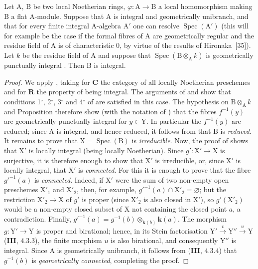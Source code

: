 \begin{corollary}[7.9.9]
\label{IV.7.9.9}
Let $\mathrm{A}$, $\mathrm{B}$ be two local Noetherian rings, $\varphi:\mathrm{A}\to\mathrm{B}$ a local homomorphism making $\mathrm{B}$ a flat $\mathrm{A}$-module. Suppose that $\mathrm{A}$ is integral and geometrically unibranch, and that for every finite integral $\mathrm{A}$-algebra $\mathrm{A}'$ one can resolve $\operatorname{Spec}(\mathrm{A}')$ \textup{(this will for example be the case if the formal fibres of $\mathrm{A}$ are geometrically regular and the residue field of $\mathrm{A}$ is of characteristic $0$, by virtue of the results of Hironaka~[35])}. Let $k$ be the residue field of $\mathrm{A}$ and suppose that $\operatorname{Spec}(\mathrm{B}\otimes_\mathrm{A} k)$ is geometrically punctually integral . Then $\mathrm{B}$ is integral.
\end{corollary}

\begin{proof}
We apply , taking for $\boldsymbol{C}$ the category of all locally Noetherian preschemes and for $\boldsymbol{R}$ the property of being integral. The arguments of  and  show that conditions 1${}^\circ$, 2${}^\circ$, 3${}^\circ$ and 4${}^\circ$ of  are satisfied in this case. The hypothesis on $\mathrm{B}\otimes_\mathrm{A}k$ and Proposition  therefore show (with the notation of ) that the fibres $f^{-1}(y)$ are geometrically punctually integral for $y\in\mathrm{Y}$. In particular the $f^{-1}(y)$ are reduced; since $\mathrm{A}$ is integral, and hence reduced, it follows from  that $\mathrm{B}$ is \emph{reduced}. It remains to prove that $\mathrm{X}=\operatorname{Spec}(\mathrm{B})$ is \emph{irreducible}. Now, the proof of  shows that $\mathrm{X}'$ is locally integral (being locally Noetherian). Since $g':\mathrm{X}'\to\mathrm{X}$ is surjective, it is therefore enough to show that $\mathrm{X}'$ is irreducible, or, since $\mathrm{X}'$ is locally integral, that $\mathrm{X}'$ is \emph{connected}. For this it is enough to prove that the fibre $g'^{-1}(a)$ is \emph{connected}. Indeed, if $\mathrm{X}'$ were the sum of two non-empty open preschemes $\mathrm{X}'_1$ and $\mathrm{X}'_2$, then, for example, $g'^{-1}(a)\cap\mathrm{X}'_2=\varnothing$; but the restriction $\mathrm{X}'_2\to\mathrm{X}$ of $g'$ is proper (since $\mathrm{X}'_2$ is also closed in $\mathrm{X}'$), so $g'(\mathrm{X}'_2)$ would be a non-empty closed subset of $\mathrm{X}$ not containing the closed point $a$, a contradiction. Finally, $g'^{-1}(a)=g^{-1}(b)\otimes_{\boldsymbol{k}(b)}\boldsymbol{k}(a)$.
The morphism $g:\mathrm{Y}'\to\mathrm{Y}$ is proper and birational; hence, in its Stein factorisation $\mathrm{Y}'\xrightarrow{v}\mathrm{Y}''\xrightarrow{u}\mathrm{Y}$ (\textbf{III}, $4.3.3$), the finite morphism $u$ is also birational, and consequently $\mathrm{Y}''$ is integral. Since $\mathrm{A}$ is geometrically unibranch, it follows from (\textbf{III}, $4.3.4$) that $g^{-1}(b)$ is \emph{geometrically connected}, completing the proof.
\end{proof}

